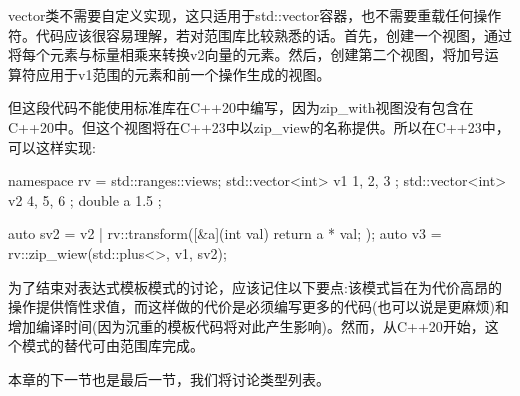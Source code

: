vector类不需要自定义实现，这只适用于std::vector容器，也不需要重载任何操作符。代码应该很容易理解，若对范围库比较熟悉的话。首先，创建一个视图，通过将每个元素与标量相乘来转换v2向量的元素。然后，创建第二个视图，将加号运算符应用于v1范围的元素和前一个操作生成的视图。

但这段代码不能使用标准库在C++20中编写，因为zip\_with视图没有包含在C++20中。但这个视图将在C++23中以zip\_view的名称提供。所以在C++23中，可以这样实现:

\begin{cpp}
namespace rv = std::ranges::views;
std::vector<int> v1{ 1, 2, 3 };
std::vector<int> v2{ 4, 5, 6 };
double a { 1.5 };

auto sv2 = v2 |
           rv::transform([&a](int val) {return a * val; });
auto v3 = rv::zip_wiew(std::plus<>{}, v1, sv2);
\end{cpp}

为了结束对表达式模板模式的讨论，应该记住以下要点:该模式旨在为代价高昂的操作提供惰性求值，而这样做的代价是必须编写更多的代码(也可以说是更麻烦)和增加编译时间(因为沉重的模板代码将对此产生影响)。然而，从C++20开始，这个模式的替代可由范围库完成。

本章的下一节也是最后一节，我们将讨论类型列表。













